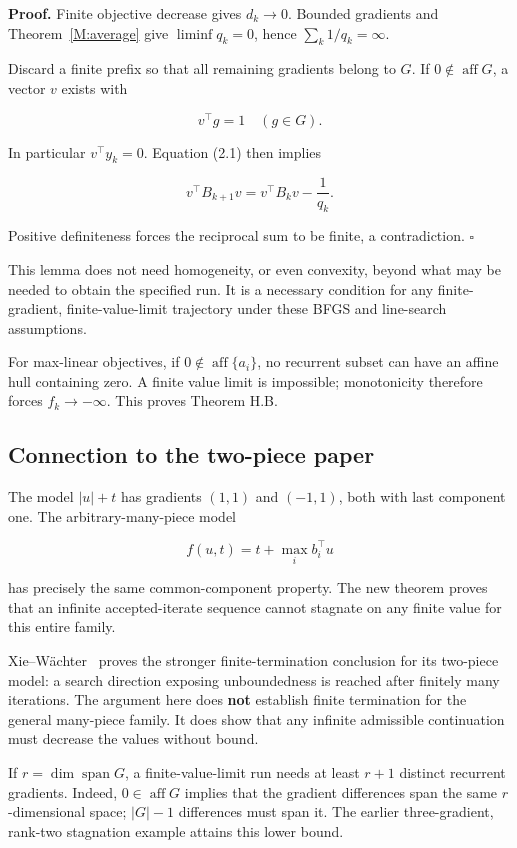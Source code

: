 \documentclass[10pt,oneside,openany]{book}
\theoremstyle{remark}\newtheorem{remark}{Remark}[chapter]
\begin{document}
\textbf{Proof.} Finite objective decrease gives \(d_k\to0\). Bounded
gradients and Theorem~\ref{M:average} give \(\liminf q_k=0\), hence
\(\sum_k1/q_k=\infty\).

Discard a finite prefix so that all remaining gradients belong to \(G\).
If \(0\notin\operatorname{aff}G\), a vector \(v\) exists with

\[
v^\top g=1\quad(g\in G).
\]

In particular \(v^\top y_k=0\). Equation (2.1) then implies

\[
v^\top B_{k+1}v=v^\top B_kv-\frac1{q_k}.
\]

Positive definiteness forces the reciprocal sum to be finite, a
contradiction. \(\square\)

This lemma does not need homogeneity, or even convexity, beyond what may
be needed to obtain the specified run. It is a necessary condition for
any finite-gradient, finite-value-limit trajectory under these BFGS and
line-search assumptions.

For max-linear objectives, if \(0\notin\operatorname{aff}\{a_i\}\), no
recurrent subset can have an affine hull containing zero. A finite value
limit is impossible; monotonicity therefore forces \(f_k\to-\infty\).
This proves Theorem H.B.

\subsection{Connection to the two-piece
paper}\label{H:connection-to-the-two-piece-paper}

The model \(|u|+t\) has gradients \((1,1)\) and \((-1,1)\), both with
last component one. The arbitrary-many-piece model

\[
f(u,t)=t+\max_i b_i^\top u
\]

has precisely the same common-component property. The new theorem proves
that an infinite accepted-iterate sequence cannot stagnate on any finite
value for this entire family.

Xie--W\"achter~\cite{XW} proves the stronger finite-termination conclusion
for its two-piece model: a search direction exposing unboundedness is
reached after finitely many iterations. The argument here does
\textbf{not} establish finite termination for the general many-piece
family. It does show that any infinite admissible continuation must
decrease the values without bound.

If \(r=\dim\operatorname{span}G\), a finite-value-limit run needs at
least \(r+1\) distinct recurrent gradients. Indeed,
\(0\in\operatorname{aff}G\) implies that the gradient differences span
the same \(r\)-dimensional space; \(|G|-1\) differences must span it.
The earlier three-gradient, rank-two stagnation example attains this
lower bound.
\end{document}
